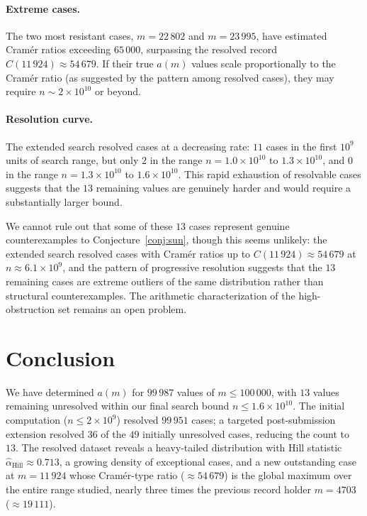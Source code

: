 \documentclass[12pt]{article}
\begin{document}
\paragraph{Extreme cases.}
The two most resistant cases, $m = 22\,802$ and $m = 23\,995$,
have estimated Cram\'er ratios exceeding $65\,000$, surpassing the
resolved record $C(11\,924) \approx 54\,679$.
If their true $a(m)$ values scale proportionally to the Cram\'er ratio
(as suggested by the pattern among resolved cases), they may require
$n \sim 2 \times 10^{10}$ or beyond.

\paragraph{Resolution curve.}
The extended search resolved cases at a decreasing rate:
$11$ cases in the first $10^9$ units of search range, but only $2$ in
the range $n = 1.0 \times 10^{10}$ to $1.3 \times 10^{10}$, and $0$
in the range $n = 1.3 \times 10^{10}$ to $1.6 \times 10^{10}$.
This rapid exhaustion of resolvable cases suggests that the $13$
remaining values are genuinely harder and would require a substantially
larger bound.

We cannot rule out that some of these $13$ cases represent genuine
counterexamples to Conjecture~\ref{conj:sun}, though this seems
unlikely: the extended search resolved cases with Cram\'er ratios up to
$C(11\,924) \approx 54\,679$ at $n \approx 6.1 \times 10^9$, and the
pattern of progressive resolution suggests that the $13$ remaining
cases are extreme outliers of the same distribution rather than
structural counterexamples.
The arithmetic characterization of the high-obstruction set remains an
open problem.

\section{Conclusion}

We have determined $a(m)$ for $99\,987$ values of $m \leq 100\,000$,
with $13$ values remaining unresolved within our final search bound
$n \leq 1.6 \times 10^{10}$.
The initial computation ($n \leq 2 \times 10^9$) resolved $99\,951$
cases; a targeted post-submission extension resolved $36$ of the
$49$ initially unresolved cases, reducing the count to~$13$.
The resolved dataset reveals a heavy-tailed distribution with Hill
statistic $\hat{\alpha}_{\mathrm{Hill}} \approx 0.713$, a growing
density of exceptional cases, and a new outstanding case at
$m = 11\,924$ whose Cram\'er-type ratio ($\approx 54\,679$) is
the global maximum over the entire range studied, nearly three times
the previous record holder $m = 4703$ ($\approx 19\,111$).
\end{document}
